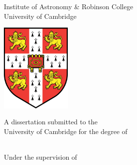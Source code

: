 \begin{titlepage}
    \begin{addmargin}[-1cm]{-3cm}
    \begin{center}

        \large 

        \hfill

        \vfill

        \begingroup
            \color{Maroon}\huge{\spacedallcaps{\myTitle}} \\ \bigskip
        \endgroup

        \vspace{2cm}

        \LARGE{\spacedallcaps{\myName}} \\
        \Large{Institute of Astronomy \& Robinson College} \\
        \Large{University of Cambridge} \\

        \vfill

        \includegraphics[width=3.5cm]{figures/Cambridge_University_Crest_-_flat.png} \\ \medskip

        \vspace{1cm}

        A dissertation submitted to the \\
        University of Cambridge for the degree of \\
         \\ \bigskip

        \vspace{1cm}

        Under the supervision of \\
         \\
         \\


\end{center}
\end{addmargin}
\end{titlepage}
